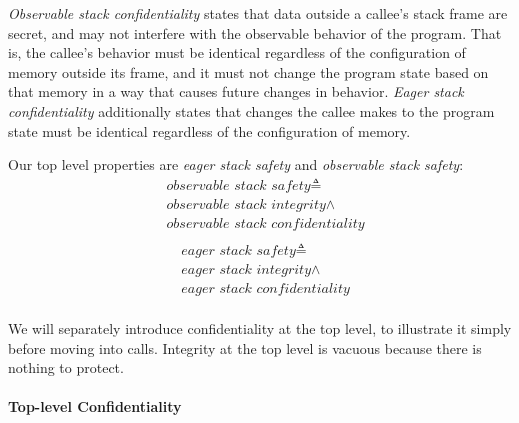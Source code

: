 \documentclass[conference]{IEEEtran}
\begin{document}
    {\it Observable stack confidentiality} states that data outside a callee's stack frame are secret,
    and may not interfere with the observable behavior of the program. That is, the callee's behavior must
    be identical regardless of the configuration of memory outside its frame, and it must not change the
    program state based on that memory in a way that causes future changes in behavior.
    {\it Eager stack confidentiality} additionally states that changes the callee makes to the program state
    must be identical regardless of the configuration of memory.

    Our top level properties are {\it eager stack safety} and {\it observable stack safety}:
    \[\begin{split}
      & \textit{observable stack safety} \triangleq \\
      & \textit{observable stack integrity} \land \\
      & \textit{observable stack confidentiality} \\
    \end{split}\]
    \[\begin{split}
      & \textit{eager stack safety} \triangleq \\
      & \textit{eager stack integrity} \land \\
      & \textit{eager stack confidentiality} \\
    \end{split}\]

    We will separately introduce confidentiality at the top level, to illustrate it simply before
    moving into calls. Integrity at the top level is vacuous because there is nothing to protect.


    \paragraph{Top-level Confidentiality}

\end{document}
